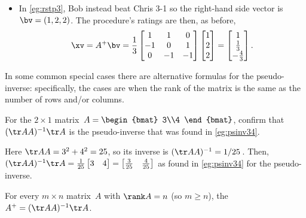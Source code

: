\begin{example}
\begin{solution}
\begin{itemize}
\item In \cref{eg:rstp3},  Bob instead beat Chris 3-1 so the right-hand side vector is \(\bv=(1,2,2)\).
The procedure's ratings are then, as before, 
\begin{equation*}
\xv=A^+\bv=\frac13\begin{bmatrix} 1&1&0
\\-1&0&1
\\0& -1&-1 \end{bmatrix}\begin{bmatrix} 1\\2\\2 \end{bmatrix}
=\begin{bmatrix} 1\\\frac13\\-\frac43 \end{bmatrix}.
\end{equation*}

\end{itemize}
\end{solution}
\end{example}



In some common special cases there are alternative formulas for the pseudo-inverse: specifically, the cases are when the rank of the matrix is the same as the number of rows and/or columns.

\begin{example}
For the \(2\times1\) matrix~\(A=\begin{bmat} 3\\4 \end{bmat}\),
confirm that \((\tr AA)^{-1}\tr A\) is the pseudo-inverse that was found in \cref{eg:psinv34}.
\begin{solution}
Here \(\tr AA=3^2+4^2=25\), so its inverse is \((\tr AA)^{-1}=1/25\)\,.
Then, \((\tr AA)^{-1}\tr A=\frac1{25}\begin{bmatrix} 3&4 \end{bmatrix}=\begin{bmatrix} \tfrac3{25}&\tfrac4{25} \end{bmatrix}\) as found in \cref{eg:psinv34} for the pseudo-inverse.
\end{solution}
\end{example}



\begin{theorem} \label{thm:pseudonormal}
For every \(m\times n\) matrix~\(A\) with \(\rank A=n\) (so \(m\geq n\)), the  \(A^+=(\tr AA)^{-1}\tr A\).
\end{theorem}

